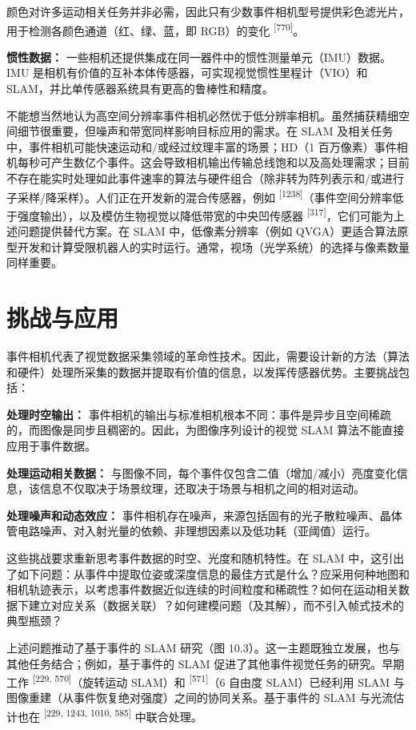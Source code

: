颜色对许多运动相关任务并非必需，因此只有少数事件相机型号提供彩色滤光片，用于检测各颜色通道（红、绿、蓝，即 RGB）的变化 \textsuperscript{[770]}。

\textbf{惯性数据：} 一些相机还提供集成在同一器件中的惯性测量单元（IMU）数据。IMU 是相机有价值的互补本体传感器，可实现视觉惯性里程计（VIO）和 SLAM，并比单传感器系统具有更高的鲁棒性和精度。

不能想当然地认为高空间分辨率事件相机必然优于低分辨率相机。虽然捕获精细空间细节很重要，但噪声和带宽同样影响目标应用的需求。在 SLAM 及相关任务中，事件相机可能快速运动和/或经过纹理丰富的场景；HD（1 百万像素）事件相机每秒可产生数亿个事件。这会导致相机输出传输总线饱和以及高处理需求；目前不存在能实时处理如此事件速率的算法与硬件组合（除非转为阵列表示和/或进行子采样/降采样）。人们正在开发新的混合传感器，例如 \textsuperscript{[1238]}（事件空间分辨率低于强度输出），以及模仿生物视觉以降低带宽的中央凹传感器 \textsuperscript{[317]}，它们可能为上述问题提供替代方案。在 SLAM 中，低像素分辨率（例如 QVGA）更适合算法原型开发和计算受限机器人的实时运行。通常，视场（光学系统）的选择与像素数量同样重要。

\section{挑战与应用}

事件相机代表了视觉数据采集领域的革命性技术。因此，需要设计新的方法（算法和硬件）处理所采集的数据并提取有价值的信息，以发挥传感器优势。主要挑战包括：

\textbf{处理时空输出：} 事件相机的输出与标准相机根本不同：事件是异步且空间稀疏的，而图像是同步且稠密的。因此，为图像序列设计的视觉 SLAM 算法不能直接应用于事件数据。

\textbf{处理运动相关数据：} 与图像不同，每个事件仅包含二值（增加/减小）亮度变化信息，该信息不仅取决于场景纹理，还取决于场景与相机之间的相对运动。

\textbf{处理噪声和动态效应：} 事件相机存在噪声，来源包括固有的光子散粒噪声、晶体管电路噪声、对入射光量的依赖、非理想因素以及低功耗（亚阈值）运行。

这些挑战要求重新思考事件数据的时空、光度和随机特性。在 SLAM 中，这引出了如下问题：从事件中提取位姿或深度信息的最佳方式是什么？应采用何种地图和相机轨迹表示，以考虑事件数据近似连续的时间粒度和稀疏性？如何在运动相关数据下建立对应关系（数据关联）？如何建模问题（及其解），而不引入帧式技术的典型瓶颈？

上述问题推动了基于事件的 SLAM 研究（图 10.3）。这一主题既独立发展，也与其他任务结合；例如，基于事件的 SLAM 促进了其他事件视觉任务的研究。早期工作 \textsuperscript{[229, 570]}（旋转运动 SLAM）和 \textsuperscript{[571]}（6 自由度 SLAM）已经利用 SLAM 与图像重建（从事件恢复绝对强度）之间的协同关系。基于事件的 SLAM 与光流估计也在 \textsuperscript{[229, 1243, 1010, 585]} 中联合处理。

